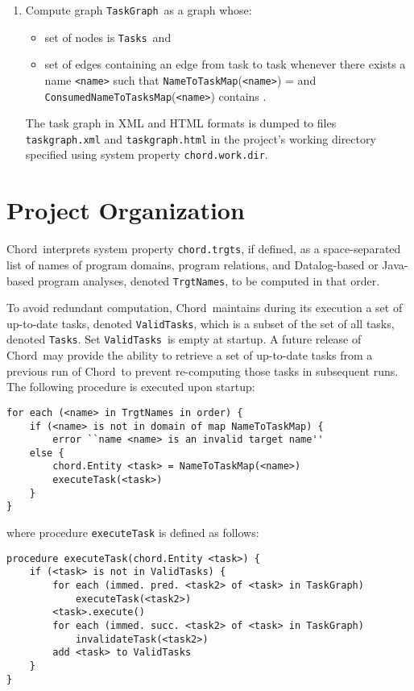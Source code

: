 \documentclass{article}
\providecommand\Chord{{Chord}}
\providecommand\NameToTaskMap{{\tt NameToTaskMap}}
\providecommand\ConsumedNameToTasksMap{{\tt ConsumedNameToTasksMap}}
\providecommand\TaskGraph{{\tt TaskGraph}}
\providecommand\Tasks{{\tt Tasks}}
\providecommand\ValidTasks{{\tt ValidTasks}}
\providecommand\TrgtNames{{\tt TrgtNames}}
\begin{document}
\begin{enumerate}
\item
Compute graph \TaskGraph\ as a graph whose:

\begin{itemize}
\item
set of nodes is \Tasks\ and
\item
set of edges containing an edge from task {\tt <task1>} to task {\tt <task2>} 
whenever there exists a name {\tt <name>} such that
\NameToTaskMap({\tt <name>}) = {\tt <task1>} and
\ConsumedNameToTasksMap({\tt <name>}) contains {\tt <task2>}.
\end{itemize}

The task graph in XML and HTML formats is dumped to files {\tt taskgraph.xml}
and {\tt taskgraph.html} in the project's working directory specified using
system property {\tt chord.work.dir}.

\end{enumerate}

\texonly{\newpage}
\section{Project Organization}

\Chord\ interprets system property {\tt chord.trgts}, if defined, as
a space-separated list of names of program domains, program relations, and
Datalog-based or Java-based program analyses, denoted \TrgtNames,
to be computed in that order.

To avoid redundant computation, \Chord\ maintains during its execution a set of
up-to-date tasks, denoted \ValidTasks,
which is a subset of the set of all tasks, denoted \Tasks.
Set \ValidTasks\ is empty at startup.
A future release of \Chord\ may provide the ability to retrieve a set of up-to-date tasks from
a previous run of \Chord\ to prevent re-computing those tasks in subsequent runs.
The following procedure is executed upon startup:

{\small
\begin{verbatim}
for each (<name> in TrgtNames in order) {
    if (<name> is not in domain of map NameToTaskMap) {
        error ``name <name> is an invalid target name''
    else {
        chord.Entity <task> = NameToTaskMap(<name>)
        executeTask(<task>)
    }
}
\end{verbatim}
}

\noindent where procedure {\tt executeTask} is defined as follows:

{\small
\begin{verbatim}
procedure executeTask(chord.Entity <task>) {
    if (<task> is not in ValidTasks) {
        for each (immed. pred. <task2> of <task> in TaskGraph)
            executeTask(<task2>)
        <task>.execute()
        for each (immed. succ. <task2> of <task> in TaskGraph)
            invalidateTask(<task2>)
        add <task> to ValidTasks
    }
}
\end{verbatim}
}
\end{document}
